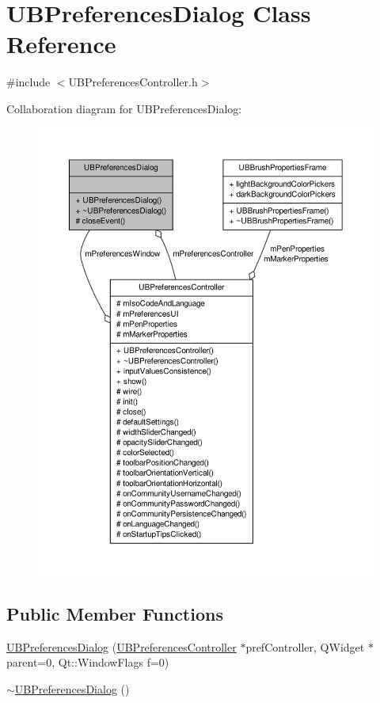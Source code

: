 \hypertarget{class_u_b_preferences_dialog}{\section{U\-B\-Preferences\-Dialog Class Reference}
\label{d4/d16/class_u_b_preferences_dialog}
}


{\ttfamily \#include $<$U\-B\-Preferences\-Controller.\-h$>$}



Collaboration diagram for U\-B\-Preferences\-Dialog\-:
\nopagebreak
\begin{figure}[H]
\begin{center}
\leavevmode
\includegraphics[width=350pt]{dc/d72/class_u_b_preferences_dialog__coll__graph}
\end{center}
\end{figure}
\subsection*{Public Member Functions}
\begin{DoxyCompactItemize}
\item 
\hyperlink{class_u_b_preferences_dialog_aa6d65af738b6fa627bb937b08fc87f3b}{U\-B\-Preferences\-Dialog} (\hyperlink{class_u_b_preferences_controller}{U\-B\-Preferences\-Controller} $\ast$pref\-Controller, Q\-Widget $\ast$parent=0, Qt\-::\-Window\-Flags f=0)
\item 
\hyperlink{class_u_b_preferences_dialog_ae753f486e73ef5d4bd78ad2607893201}{$\sim$\-U\-B\-Preferences\-Dialog} ()
\end{DoxyCompactItemize}
